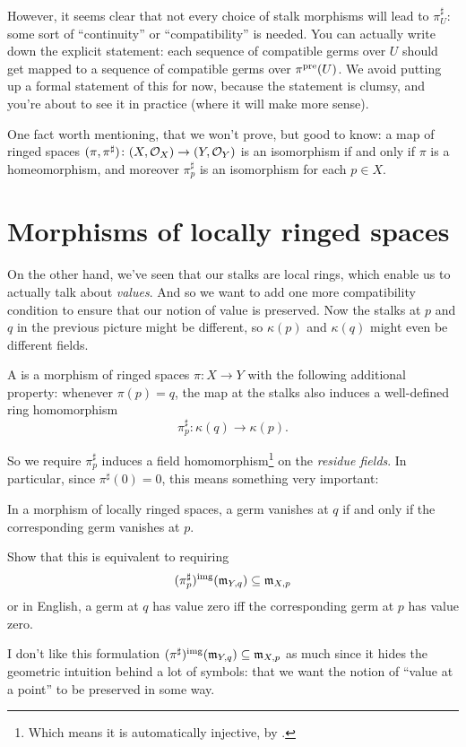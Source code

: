 However, it seems clear that not every choice of
stalk morphisms will lead to $\pi^\sharp_U$:
some sort of ``continuity'' or ``compatibility'' is needed.
You can actually write down the explicit statement:
each sequence of compatible germs over $U$
should get mapped to a sequence of compatible germs over $\pi^{\text{pre}}(U)$.
We avoid putting up a formal statement of this for now,
because the statement is clumsy,
and you're about to see it in practice (where it will make more sense).

\begin{remark}
	One fact worth mentioning, that we won't prove, but good to know:
	a map of ringed spaces
	$(\pi, \pi^\sharp) \colon (X, \mathcal O_X) \to (Y, \mathcal O_Y)$
	is an isomorphism if and only if $\pi$ is a homeomorphism,
	and moreover $\pi^\sharp_p$ is an isomorphism for each $p \in X$.
\end{remark}

\section{Morphisms of locally ringed spaces}
On the other hand, we've seen that our stalks are local rings,
which enable us to actually talk about \emph{values}.
And so we want to add one more compatibility condition
to ensure that our notion of value is preserved.
Now the stalks at $p$ and $q$ in the previous picture might be different,
so $\kappa(p)$ and $\kappa(q)$ might even be different fields.
\begin{definition}
	A 
	is a morphism of ringed spaces $\pi \colon X \to Y$
	with the following additional property:
	whenever $\pi(p) = q$,
	the map at the stalks also induces a well-defined ring homomorphism
	\[ \pi^\sharp_p \colon \kappa(q) \to \kappa(p). \]
\end{definition}
So we require $\pi^\sharp_p$ induces a field homomorphism\footnote{Which
means it is automatically injective, by .}
on the \emph{residue fields}.
In particular, since $\pi^\sharp(0) = 0$,
this means something very important:
\begin{moral}
	In a morphism of locally ringed spaces,
	a germ vanishes at $q$ if and only if
	the corresponding germ vanishes at $p$.
\end{moral}
\begin{exercise}
	Show that this is equivalent to requiring
	\[ (\pi^\sharp_p)^{\text{img}}(\mathfrak m_{Y,q}) \subseteq \mathfrak m_{X,p} \]
	or in English, a germ at $q$ has value zero
	iff the corresponding germ at $p$ has value zero.
\end{exercise}
I don't like this formulation
$(\pi^\sharp)^{\text{img}}(\mathfrak m_{Y,q}) \subseteq \mathfrak m_{X,p}$
as much since it hides the geometric intuition behind a lot of symbols:
that we want the notion of ``value at a point''
to be preserved in some way.

